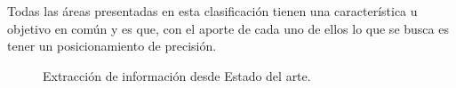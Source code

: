 Todas las áreas presentadas en esta clasificación tienen una característica u objetivo en común y es que, con el aporte de cada uno de ellos lo que se busca es tener un posicionamiento de precisión. 

\begin{figure}[h]
	\centering
	\caption{Extracción de información desde Estado del arte.}
	\label{fig:EstadoArte1}
\end{figure}

